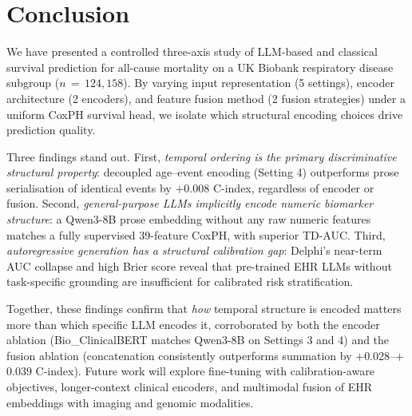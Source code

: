 \section{Conclusion}

We have presented a controlled three-axis study of LLM-based and classical
survival prediction for all-cause mortality on a UK Biobank respiratory
disease subgroup ($n\,=\,124{,}158$).
By varying input representation (5 settings), encoder architecture (2
encoders), and feature fusion method (2 fusion strategies) under a uniform
CoxPH survival head, we isolate which structural encoding choices drive
prediction quality.

Three findings stand out.
First, \emph{temporal ordering is the primary discriminative structural
property}: decoupled age--event encoding (Setting 4) outperforms prose
serialisation of identical events by $+$0.008 C-index, regardless of
encoder or fusion.
Second, \emph{general-purpose LLMs implicitly encode numeric biomarker
structure}: a Qwen3-8B prose embedding without any raw numeric features
matches a fully supervised 39-feature CoxPH, with superior TD-AUC.
Third, \emph{autoregressive generation has a structural calibration
gap}: Delphi's near-term AUC collapse and high Brier score reveal that
pre-trained EHR LLMs without task-specific grounding are insufficient for
calibrated risk stratification.

Together, these findings confirm that \emph{how} temporal structure is
encoded matters more than which specific LLM encodes it, corroborated by
both the encoder ablation (Bio\_ClinicalBERT matches Qwen3-8B on Settings 3
and 4) and the fusion ablation (concatenation consistently outperforms
summation by $+$0.028--$+$0.039 C-index).
Future work will explore fine-tuning with calibration-aware objectives,
longer-context clinical encoders, and multimodal fusion of EHR embeddings
with imaging and genomic modalities.
